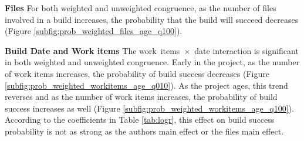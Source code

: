 \textbf{Files} For both weighted and unweighted congruence, as the number of files involved in a build increases, the probability that the build will succeed decreases (Figure \ref{subfig:prob_weighted_files_age_q100}).

\textbf{Build Date and Work items} The work~items~$\times$~date interaction is significant in both weighted and unweighted congruence. Early in the project, as the number of work items increases, the probability of build success decreases (Figure \ref{subfig:prob_weighted_workitems_age_q010}). As the project ages, this trend reverses and as the number of work items increases, the probability of build success increases as well (Figure \ref{subfig:prob_weighted_workitems_age_q100}). According to the coefficients in Table \ref{tab:logr}, this effect on build success probability is not as strong as the authors main effect or the files main effect.

